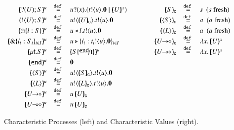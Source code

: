\documentclass[preprint,11pt]{elsarticle}
\begin{document}
{%
\begin{figure}[t!]
\[
	\begin{array}{rclcrcl}
		\mapchar{\btinp{U} S}{u}
		&\defeq&
		\binp{u}{x} (\bout{t}{u} \inact \Par \mapchar{U}{x})
		&\qquad &
		\omapchar{S}  & \defeq &  s ~~ (s \textrm{ fresh})
		\\
		\mapchar{\btout{U} S}{u}
		&\defeq&
		\bout{u}{\omapchar{U}} \bout{t}{u} \inact
		&&
		\omapchar{\chtype{S}} &\defeq& a ~~ (a \textrm{ fresh})
		\\
		\mapchar{\btsel{l : S}}{u}
		& \defeq &
		\bsel{u}{l} \bout{t}{u} \inact
		&&
		\omapchar{\chtype{L}} &\defeq&a ~~ (a \textrm{ fresh})
		\\
		\mapchar{\btbra{l_i: S_i}_{i \in I}}{u}
		& \defeq &
		\bbra{u}{l_i: \bout{t_i}{u} \inact}_{i \in I}		 
		&&
		\omapchar{\shot{U}} &\defeq& \abs{x}{\mapchar{U}{x}}
		\\
		 
%
		\mapchar{ \trec{t}{S} }{u} &\defeq& \mapchar{S \subst{\tinact}{\vart{t}} }{u}

		&&
		\omapchar{\lhot{U}} & \defeq &  \abs{x}{\mapchar{U}{x}}
		\\
		\mapchar{\tinact}{u}
		& \defeq &
		\inact
		\\
		\mapchar{\chtype{S}}{u} 
		&\defeq&
		\bout{u}{\omapchar{S}} \bout{t}{u} \inact		 
		\\
		\mapchar{\chtype{L}}{u}
		&\defeq&
		 \bout{u}{\omapchar{L}} \bout{t}{u} \inact 
		\\
		\mapchar{\shot{U}}{u}
		&\defeq& 
		\appl{u}{\omapchar{U}}
		\\
		\mapchar{\lhot{U}}{u}
		&\defeq &
		\appl{u}{\omapchar{U}}
	\end{array}
	\]
\caption{Characteristic Processes (left) and Characteristic Values (right).\label{fig:char}}
%
\end{figure}


}
\end{document}
